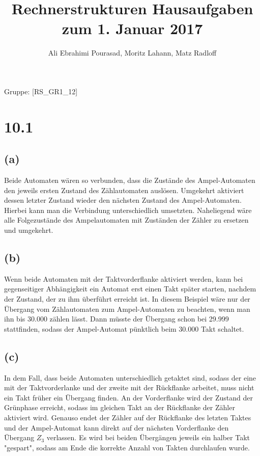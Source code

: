 \documentclass[11pt,a4paper]{article}
\title{\textbf{Rechnerstrukturen Hausaufgaben zum 1. Januar 2017}}
\author{Ali Ebrahimi Pourasad, Moritz Lahann, Matz Radloff}
\begin{document}
  \maketitle
  \date{}
  Gruppe: [RS\_GR1\_12]
\newpage
\section*{10.1}

\subsection*{(a)}

Beide Automaten wären so verbunden, dass die Zustände des Ampel-Automaten den jeweils ersten Zustand des Zählautomaten auslösen. Umgekehrt aktiviert dessen letzter Zustand wieder den nächsten Zustand des Ampel-Automaten. Hierbei kann man die Verbindung unterschiedlich umsetzten. Naheliegend wäre alle Folgezustände des Ampelautomaten mit Zuständen der Zähler zu ersetzen und umgekehrt.

\subsection*{(b)}

Wenn beide Automaten mit der Taktvorderflanke aktiviert werden, kann bei gegenseitiger Abhängigkeit ein Automat erst einen Takt später starten, nachdem der Zustand, der zu ihm überführt erreicht ist. In diesem Beispiel wäre nur der Übergang vom Zählautomaten zum Ampel-Automaten zu beachten, wenn man ihn bis $30.000$ zählen lässt. Dann müsste der Übergang schon bei 29.999 stattfinden, sodass der Ampel-Automat pünktlich beim 30.000 Takt schaltet.

\subsection*{(c)}

In dem Fall, dass beide Automaten unterschiedlich getaktet sind, sodass der eine mit der Taktvorderlanke und der zweite mit der Rückflanke arbeitet, muss nicht ein Takt früher ein Übergang finden. An der Vorderflanke wird der Zustand der Grünphase erreicht, sodass im gleichen Takt an der Rückflanke der Zähler aktiviert wird. Genauso endet der Zähler auf der Rückflanke des letzten Taktes und der Ampel-Automat kann direkt auf der nächsten Vorderflanke den Übergang $Z_3$ verlassen. Es wird bei beiden Übergängen jeweils ein halber Takt "gespart", sodass am Ende die korrekte Anzahl von Takten durchlaufen wurde.
\end{document}
